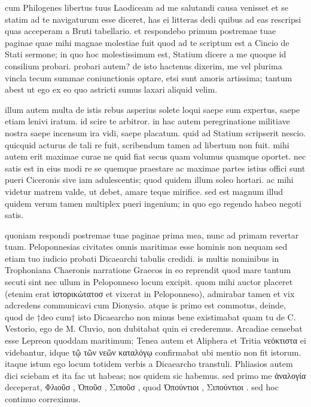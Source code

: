 


 cum Philogenes libertus tuus Laodiceam ad me salutandi causa venisset et se statim ad te navigaturum esse diceret, has ei litteras dedi quibus ad eas rescripsi quas acceperam a Bruti tabellario. et respondebo primum postremae tuae paginae quae mihi magnae molestiae fuit quod ad te scriptum est a Cincio de Stati sermone; in quo hoc molestissimum est, Statium dicere a me quoque id consilium probari. probari autem? de isto hactenus dixerim, me vel plurima vincla tecum summae coniunctionis optare, etsi sunt amoris artissima; tantum abest ut ego ex eo quo astricti sumus laxari aliquid velim.

 illum autem multa de istis rebus asperius solete loqui saepe sum expertus, saepe etiam lenivi iratum. id scire te arbitror. in hac autem peregrinatione militiave nostra saepe incensum ira vidi, saepe placatum. quid ad Statium scripserit nescio. quicquid acturus de tali re fuit, scribendum tamen ad libertum non fuit. mihi autem erit maximae curae ne quid fiat secus quam volumus quamque oportet. nec satis est in eius modi re se quemque praestare ac maximae partes istius offici sunt pueri Ciceronis sive iam adulescentis; quod quidem illum soleo hortari. ac mihi videtur matrem valde, ut debet, amare teque mirifice. sed est magnum illud quidem verum tamen multiplex pueri ingenium; in quo ego regendo habeo negoti satis.

 quoniam respondi postremae tuae paginae prima mea, nunc ad primam revertar tuam. Peloponnesias civitates omnis maritimas esse hominis non nequam sed etiam tuo iudicio probati Dicaearchi tabulis credidi. is multis nominibus in Trophoniana Chaeronis narratione Graecos in eo reprendit quod mare tantum secuti sint nec ullum in Peloponneso locum excipit. quom mihi auctor placeret (etenim erat ἱστορικώτατοσ et vixerat in Peloponneso), admirabar tamen et vix adcredens communicavi cum Dionysio. atque is primo est commotus, deinde, quod de †deo cum† isto Dicaearcho non minus bene existimabat quam tu de C. Vestorio, ego de M. Cluvio, non dubitabat quin ei crederemus. Arcadiae censebat esse Lepreon quoddam maritimum; Tenea autem et Aliphera et Tritia νεόκτιστα ei videbantur, idque τῷ τῶν νεῶν καταλόγῳ confirmabat ubi mentio non fit istorum. itaque istum ego locum totidem verbis a Dicaearcho transtuli. Phliasios autem dici sciebam et ita fac ut habeas; nos quidem sic habemus. sed primo me ἀναλογία deceperat, Φλιοῦσ , Ὀποῦσ , Σιποῦσ , quod Ὀπούντιοι , Σιπούντιοι . sed hoc continuo correximus.

